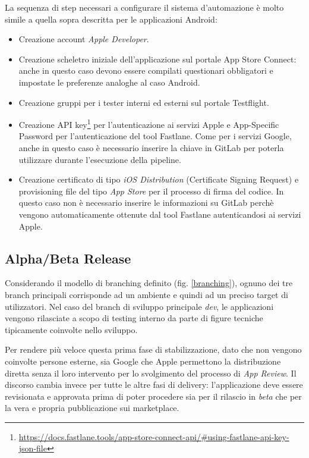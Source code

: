 La sequenza di step necessari a configurare il sistema d'automazione è molto simile a quella sopra descritta per le applicazioni Android:

\begin{itemize}
    \item Creazione account \textit{Apple Developer}.
    
    \item Creazione scheletro iniziale dell'applicazione sul portale App Store Connect: anche in questo caso devono essere compilati questionari obbligatori e impostate le preferenze analoghe al caso Android.
    
    \item Creazione gruppi per i tester interni ed esterni sul portale Testflight.
    
    \item Creazione API key\footnote{\href{https://docs.fastlane.tools/app-store-connect-api/\#using-fastlane-api-key-json-file}{https://docs.fastlane.tools/app-store-connect-api/\#using-fastlane-api-key-json-file}} per l'autenticazione ai servizi Apple e App-Specific Password per l'autenticazione del tool Fastlane. Come per i servizi Google, anche in questo caso è necessario inserire la chiave in GitLab per poterla utilizzare durante l'esecuzione della pipeline.
    
    \item Creazione certificato di tipo \textit{iOS Distribution} (Certificate Signing Request) e provisioning file del tipo \textit{App Store} per il processo di firma del codice. In questo caso non è necessario inserire le informazioni su GitLab perchè vengono automaticamente ottenute dal tool Fastlane autenticandosi ai servizi Apple.
\end{itemize}

\subsection{Alpha/Beta Release}
Considerando il modello di branching definito (fig. \ref{branching}), 
ognuno dei tre branch principali corrisponde ad un ambiente e quindi ad un preciso target di utilizzatori. 
Nel caso del branch di sviluppo principale \textit{dev}, 
le applicazioni vengono rilasciate a scopo di testing interno da parte di figure tecniche tipicamente coinvolte nello sviluppo. 

Per rendere più veloce questa prima fase di stabilizzazione, 
dato che non vengono coinvolte persone esterne, 
sia Google che Apple permettono la distribuzione diretta senza il loro intervento per lo svolgimento del processo di \textit{App Review}.
Il discorso cambia invece per tutte le altre fasi di delivery: 
l'applicazione deve essere revisionata e approvata prima di poter procedere sia per il rilascio in \textit{beta} che per la vera e propria pubblicazione sui marketplace.

